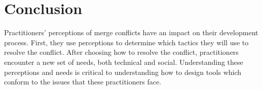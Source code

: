 \section{Conclusion}\label{conclusion}
Practitioners' perceptions of merge conflicts have an impact on their development process. First, they use perceptions to determine which tactics they will use to resolve the conflict.
After choosing how to resolve the conflict, practitioners encounter a new set of needs, both technical and social. 
Understanding these perceptions and needs is critical to understanding how to design tools which conform to the issues that these practitioners face.

%
%

